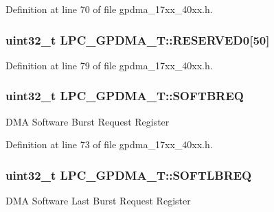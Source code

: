 Definition at line 70 of file gpdma\+\_\+17xx\+\_\+40xx.\+h.

\subsubsection[{\texorpdfstring{R\+E\+S\+E\+R\+V\+E\+D0}{RESERVED0}}]{ uint32\+\_\+t L\+P\+C\+\_\+\+G\+P\+D\+M\+A\+\_\+\+T\+::\+R\+E\+S\+E\+R\+V\+E\+D0\mbox{[}50\mbox{]}}\hypertarget{structLPC__GPDMA__T_aa500686787db277559756be8d486c0c2}{}\label{structLPC__GPDMA__T_aa500686787db277559756be8d486c0c2}


Definition at line 79 of file gpdma\+\_\+17xx\+\_\+40xx.\+h.

\subsubsection[{\texorpdfstring{S\+O\+F\+T\+B\+R\+EQ}{SOFTBREQ}}]{ uint32\+\_\+t L\+P\+C\+\_\+\+G\+P\+D\+M\+A\+\_\+\+T\+::\+S\+O\+F\+T\+B\+R\+EQ}\hypertarget{structLPC__GPDMA__T_ac6bbc437741b88b7178437840f482bd7}{}\label{structLPC__GPDMA__T_ac6bbc437741b88b7178437840f482bd7}
D\+MA Software Burst Request Register 

Definition at line 73 of file gpdma\+\_\+17xx\+\_\+40xx.\+h.

\subsubsection[{\texorpdfstring{S\+O\+F\+T\+L\+B\+R\+EQ}{SOFTLBREQ}}]{ uint32\+\_\+t L\+P\+C\+\_\+\+G\+P\+D\+M\+A\+\_\+\+T\+::\+S\+O\+F\+T\+L\+B\+R\+EQ}\hypertarget{structLPC__GPDMA__T_a565d4d2985feee1cf21acee1185373a5}{}\label{structLPC__GPDMA__T_a565d4d2985feee1cf21acee1185373a5}
D\+MA Software Last Burst Request Register 

